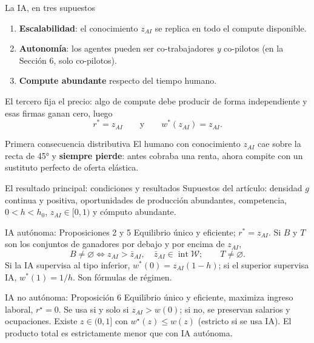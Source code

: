 \documentclass[11pt,aspectratio=169]{beamer}
\newcommand{\zai}{z_{AI}}
\newcommand{\W}{\mathcal W}
\begin{document}
\begin{frame}{La IA, en tres supuestos}
  \begin{enumerate}
    \item \textbf{Escalabilidad}: el conocimiento $\zai$ se replica en todo el compute disponible.
    \item \textbf{Autonomía}: los agentes pueden ser co-trabajadores \emph{y} co-pilotos (en la
      Sección 6, solo co-pilotos).
    \item \textbf{Compute abundante} respecto del tiempo humano.
  \end{enumerate}
  \vfill
  El tercero fija el precio: algo de compute debe producir de forma independiente y esas firmas ganan
  cero, luego
  \[
    r^{*}=\zai \qquad\text{y}\qquad w^{*}(\zai)=\zai .
  \]
  \begin{block}{Primera consecuencia distributiva}
    El humano con conocimiento $\zai$ cae sobre la recta de 45° y \textbf{siempre pierde}: antes
    cobraba una renta, ahora compite con un sustituto perfecto de oferta elástica.
  \end{block}
\end{frame}

\begin{frame}{El resultado principal: condiciones y resultados}
  \small
  Supuestos del artículo: densidad $g$ continua y positiva, oportunidades de producción abundantes,
  competencia, $0<h<h_0$, $\zai\in[0,1)$ y cómputo abundante.
  \begin{block}{IA autónoma: Proposiciones 2 y 5}
    Equilibrio único y eficiente; $r^*=\zai$. Si $B$ y $T$ son los conjuntos de ganadores
    por debajo y por encima de $\zai$,
    \[
      B\ne\varnothing\iff\zai>\bar z_{AI},\quad
      \bar z_{AI}\in\operatorname{int}\W;
      \qquad T\ne\varnothing.
    \]
    Si la IA supervisa al tipo inferior, $w^*(0)=\zai(1-h)$; si el superior supervisa IA,
    $w^*(1)=1/h$. Son fórmulas de régimen.
  \end{block}
  \begin{block}{IA no autónoma: Proposición 6}
    Equilibrio único y eficiente, maximiza ingreso laboral, $r^\star=0$.
    Se usa si y solo si $\zai>w(0)$; si no, se preservan salarios y ocupaciones.
    Existe $z\in(0,1]$ con $w^\star(z)\le w(z)$ (estricto si se usa IA).
    El producto total es estrictamente menor que con IA autónoma.
  \end{block}
\end{frame}
\end{document}
